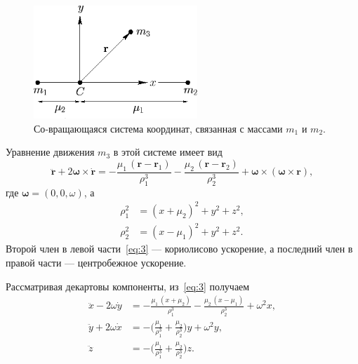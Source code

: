 \documentclass[12pt]{article}
\newcommand{\rvec}{\mathbf r}
\newcommand{\rone}{\mathbf r_1}
\newcommand{\rtwo}{\mathbf r_2}
\newcommand{\omegav}{\boldsymbol{\omega}}
\newcommand{\muone}{\mu_1}
\newcommand{\mutwo}{\mu_2}
\begin{document}
\begin{figure}[H]
  \centering
  \includegraphics[width=0.55\textwidth]{image1.png}
  \caption{Со‑вращающаяся система координат, связанная с массами $m_1$ и $m_2$.}
  \label{fig:corot}
\end{figure}

Уравнение движения $m_3$ в этой системе имеет вид
\begin{equation}\label{eq:3}
  \ddot{\rvec}+2\omegav\times\dot{\rvec}
  = -\frac{\muone\,(\rvec-\rone)}{\rho_1^{3}}
    -\frac{\mutwo\,(\rvec-\rtwo)}{\rho_2^{3}}
    +\omegav\times(\omegav\times \rvec),
\end{equation}
где $\omegav=(0,0,\omega)$, а
\begin{align}\label{eq:4}
  \rho_1^{2} &= (x+\mutwo)^2 + y^{2}+z^{2},\\[2pt]
  \rho_2^{2} &= (x-\muone)^2 + y^{2}+z^{2}.\label{eq:5}
\end{align}
Второй член в левой части~\eqref{eq:3} — кориолисово ускорение, а последний член в правой части — центробежное ускорение.

Рассматривая декартовы компоненты, из~\eqref{eq:3} получаем
\begin{align}\label{eq:6}
  \ddot x - 2\omega\dot y &= -\frac{\muone\,(x+\mutwo)}{\rho_1^{3}}-\frac{\mutwo\,(x-\muone)}{\rho_2^{3}}+\omega^{2}x,\\[2pt]
\label{eq:7}
  \ddot y + 2\omega\dot x &= -\biggl(\frac{\muone}{\rho_1^{3}}+\frac{\mutwo}{\rho_2^{3}}\biggr)y + \omega^{2}y,\\[2pt]
\label{eq:8}
  \ddot z &= -\biggl(\frac{\muone}{\rho_1^{3}}+\frac{\mutwo}{\rho_2^{3}}\biggr)z.
\end{align}
\end{document}
